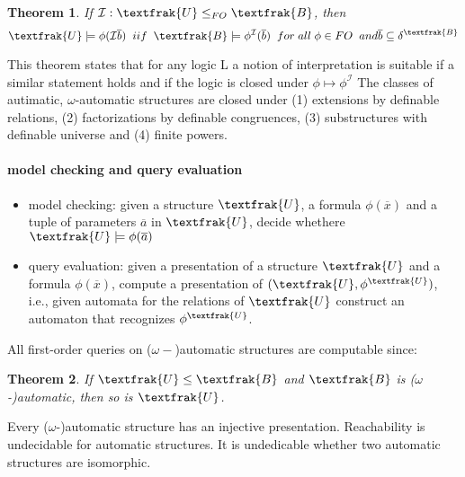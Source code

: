 \documentclass[]{article}
\newtheorem{theorem}{Theorem}
\begin{document}
\begin{theorem}
    If $\mathcal{I} : \textfrak{U}\leq_{FO} \textfrak{B}$, then 
    \begin{equation}
        \textfrak{U} \models \phi (\mathcal{I}{\overline{b}})\;\; iif \;\; \textfrak{B}\models \phi^\mathcal{I} (\overline{b}) \;\; for\; all\; \phi\in FO\;\; and \overline{b}\subseteq \delta^\textfrak{B} 
    \end{equation}
\end{theorem}
This theorem states that for any logic L a notion of interpretation is suitable if a similar statement holds and if the logic is closed under $\phi \mapsto \phi^\mathcal{I}$
The classes of autimatic, $\omega$-automatic structures are closed under 
(1) extensions by definable relations, (2) factorizations by definable congruences, (3) substructures with definable universe and (4) finite powers. 

\paragraph{model checking and query evaluation}
\begin{itemize}
    \item model checking: given a structure $\textfrak{U}$, a formula $\phi(\overline{x})$ and a tuple of parameters $\overline{a}$ in $\textfrak{U}$, decide whethere $\textfrak{U}\models \phi(\overline{a})$
    \item query evaluation: given a presentation of a structure $\textfrak{U}$ and a formula $\phi(\overline{x})$, compute a presentation of $(\textfrak{U},\phi^\textfrak{U})$, i.e., given automata for the relations of $\textfrak{U}$ 
    construct an automaton that recognizes $\phi^\textfrak{U}$.
\end{itemize}
All first-order queries on ($\omega-$)automatic structures are computable since: 
\begin{theorem}
    If $\textfrak{U}\leq \textfrak{B}$ and $\textfrak{B}$ is ($\omega$-)automatic, then so is $\textfrak{U}$.
\end{theorem}
Every ($\omega$-)automatic structure has an injective presentation.
Reachability is undecidable for automatic structures. 
It is undedicable whether two automatic structures are isomorphic.
\end{document}
